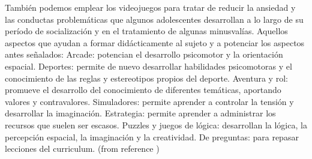 \documentclass{bmcart}
\begin{document}
	También podemos emplear los videojuegos para tratar de reducir la ansiedad y las conductas problemáticas que algunos adolescentes desarrollan a lo largo de su período de socialización y en el tratamiento de algunas minusvalías.
	\newline
	\newline
	Aquellos aspectos que ayudan a formar didácticamente al sujeto y a potenciar los aspectos antes señalados:
	\newline
	\newline
		Arcade: potencian el desarrollo psicomotor y la orientación espacial.
		Deportes: permite de nuevo desarrollar habilidades psicomotoras y el conocimiento de las reglas y estereotipos propios del deporte.
		Aventura y rol: promueve el desarrollo del conocimiento de diferentes temáticas, aportando valores y contravalores.
		Simuladores: permite aprender a controlar la tensión y desarrollar la imaginación.
		Estrategia: permite aprender a administrar los recursos que suelen ser escasos.
		Puzzles y juegos de lógica: desarrollan la lógica, la percepción espacial, la imaginación y la creatividad.
		De preguntas: para repasar lecciones del curriculum.
	(from reference \cite{diaz2005videojuegos})
\end{document}
